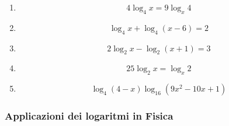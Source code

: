 \begin{enumerate}
\item 
\begin{equation*}
4\log_4 x=9\log_x 4
\end{equation*}

\item \begin{equation*}
\log_4x+\log_4(x-6)=2
\end{equation*}

\item \begin{equation*}
2\log_2 x-\log_2(x+1)=3
\end{equation*}

\item \begin{equation*}
25\log_2x=\log_x2
\end{equation*}

\item \begin{equation*}
\log_4(4-x)\log_{16}(9x^2-10x+1)
\end{equation*}

\end{enumerate}

\subsubsection{Applicazioni dei logaritmi in Fisica}\label{subsec:val_num}


